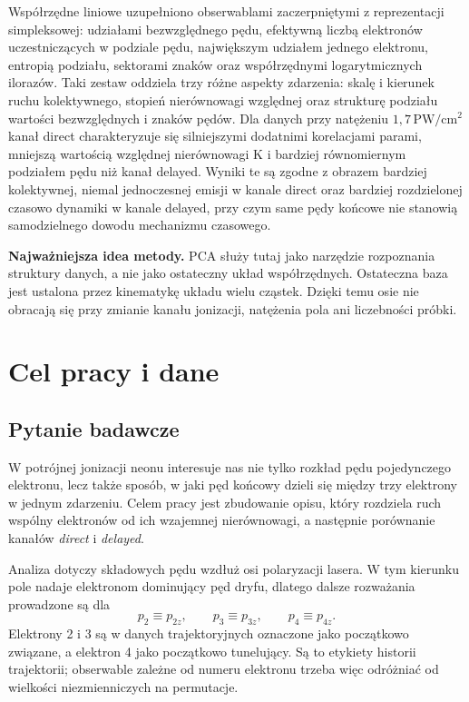 \documentclass[12pt,letterpaper,oneside]{report}
\numberwithin{equation}{chapter}
\numberwithin{figure}{chapter}
\numberwithin{table}{chapter}
\newenvironment{importantbox}[1]
  {\par\medskip\noindent\textbf{#1.}\quad}
  {\par\medskip}
\begin{document}
Współrzędne liniowe uzupełniono obserwablami zaczerpniętymi z
reprezentacji simpleksowej: udziałami bezwzględnego pędu, efektywną
liczbą elektronów uczestniczących w podziale pędu, największym udziałem
jednego elektronu, entropią podziału, sektorami znaków oraz
współrzędnymi logarytmicznych ilorazów. Taki zestaw oddziela trzy różne
aspekty zdarzenia: skalę i kierunek ruchu kolektywnego, stopień
nierównowagi względnej oraz strukturę podziału wartości bezwzględnych i
znaków pędów. Dla danych przy natężeniu \ensuremath{1{,}7\,\mathrm{PW/cm^2}} kanał direct
charakteryzuje się silniejszymi dodatnimi korelacjami parami, mniejszą
wartością względnej nierównowagi K i bardziej równomiernym podziałem
pędu niż kanał delayed. Wyniki te są zgodne z obrazem bardziej
kolektywnej, niemal jednoczesnej emisji w kanale direct oraz bardziej
rozdzielonej czasowo dynamiki w kanale delayed, przy czym same pędy
końcowe nie stanowią samodzielnego dowodu mechanizmu czasowego.

\begin{importantbox}{Najważniejsza idea metody}
PCA służy tutaj jako narzędzie rozpoznania struktury danych, a nie jako
ostateczny układ współrzędnych. Ostateczna baza jest ustalona przez
kinematykę układu wielu cząstek. Dzięki temu osie nie obracają się przy
zmianie kanału jonizacji, natężenia pola ani liczebności próbki.
\end{importantbox}


\clearpage
\thispagestyle{empty}
\null
\clearpage
\chapter{Cel pracy i dane}

\section{Pytanie badawcze}

W potrójnej jonizacji neonu interesuje nas nie tylko rozkład pędu
pojedynczego elektronu, lecz także sposób, w jaki pęd końcowy dzieli się
między trzy elektrony w jednym zdarzeniu. Celem pracy jest zbudowanie
opisu, który rozdziela ruch wspólny elektronów od ich wzajemnej
nierównowagi, a następnie porównanie kanałów \textit{direct} i
\textit{delayed}.

Analiza dotyczy składowych pędu wzdłuż osi polaryzacji lasera. W tym
kierunku pole nadaje elektronom dominujący pęd dryfu, dlatego dalsze
rozważania prowadzone są dla
\[
p_2\equiv p_{2z},\qquad p_3\equiv p_{3z},\qquad p_4\equiv p_{4z}.
\]
Elektrony 2 i 3 są w danych trajektoryjnych oznaczone jako początkowo
związane, a elektron 4 jako początkowo tunelujący. Są to etykiety
historii trajektorii; obserwable zależne od numeru elektronu trzeba więc
odróżniać od wielkości niezmienniczych na permutacje.
\end{document}
